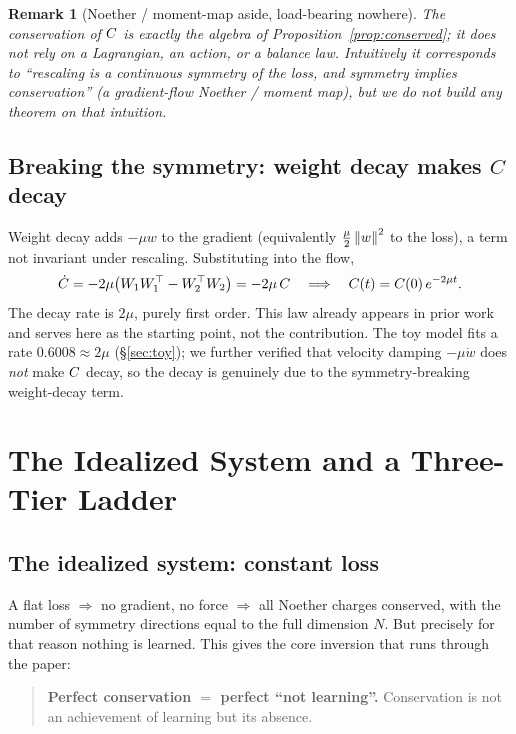 \documentclass[11pt]{article}
\newtheorem{Remark}[Theorem]{Remark}
\begin{document}
\begin{Remark}[Noether / moment-map aside, load-bearing nowhere]
The conservation of $C$ is exactly the algebra of Proposition~\ref{prop:conserved}; it does not
rely on a Lagrangian, an action, or a balance law. Intuitively it corresponds to ``rescaling is a
continuous symmetry of the loss, and symmetry implies conservation'' (a gradient-flow Noether /
moment map), but we do not build any theorem on that intuition.
\end{Remark}

\subsection{Breaking the symmetry: weight decay makes \texorpdfstring{$C$}{C} decay}\label{sec:setup:break}
Weight decay adds $-\mu w$ to the gradient (equivalently $\tfrac{\mu}{2}\left\lVert w \right\rVert^2$ to the loss),
a term not invariant under rescaling. Substituting into the flow,
\begin{equation}\label{eq:Cdecay}
  \dot{C} = -2\mu\big(W_1W_1^\top - W_2^\top W_2\big) = -2\mu\,C
  \quad\Longrightarrow\quad C(t)=C(0)\,e^{-2\mu t}.
\end{equation}
The decay rate is $2\mu$, purely first order. This law already appears in prior
work~\citep{kunin2021neural} and serves here as the starting point, not the contribution. The toy
model fits a rate $0.6008\approx 2\mu$ (\S\ref{sec:toy}); we further verified that velocity damping
$-\mu\dot w$ does \emph{not} make $C$ decay, so the decay is genuinely due to the
symmetry-breaking weight-decay term.

\section{The Idealized System and a Three-Tier Ladder}\label{sec:ladder}

\subsection{The idealized system: constant loss}\label{sec:ladder:flat}
A flat loss $\Rightarrow$ no gradient, no force $\Rightarrow$ all Noether charges conserved, with the
number of symmetry directions equal to the full dimension $N$. But precisely for that reason nothing
is learned. This gives the core inversion that runs through the paper:
\begin{quote}
\textbf{Perfect conservation $=$ perfect ``not learning''.} Conservation is not an achievement of
learning but its absence.
\end{quote}
\end{document}
